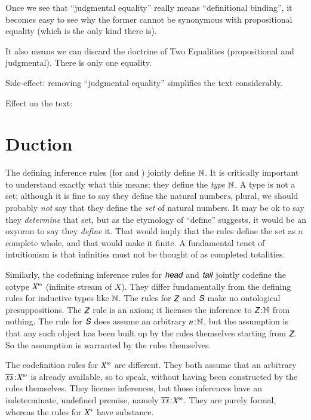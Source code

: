 \documentclass{article}
\begin{document}
Once we see that ``judgmental equality'' really means ``definitional
binding'', it becomes easy to see why the former cannot be synonymous
with propositional equality (which is the only kind there is).

It also means we can discard the doctrine of Two Equalities
(propositional and judgmental). There is only one equality.

Side-effect: removing ``judgmental equality'' simplifies the text
considerably.

Effect on the text:


\section{Duction}

The defining inference rules (for \ZNat and \SNat) jointly define
\(\mathbb{N}\). It is critically important to understand exactly what this
means: they define the \textit{type} \(\mathbb{N}\). A type is not a set;
although it is fine to say they define the natural number\textit{s},
plural, we should probably \textit{not} say that they define the
\textit{set} of natural numbers. It may be ok to say they
\textit{determine} that set, but as the etymology of ``define''
suggests, it would be an oxyoron to say they \textit{define} it. That
would imply that the rules define the set as a complete whole, and
that would make it finite. A fundamental tenet of intuitionism is that
infinities must not be thought of as completed totalities.

Similarly, the codefining inference rules for \(\cohead\) and
\(\cotail\) jointly codefine the cotype \(\colist{X}\) (infinite
stream of \(X\)). They differ fundamentally from the defining rules
for inductive types like \(\mathbb{N}\). The rules for \(\ZNat\) and
\(\SNat\) make no ontological presuppositions. The \(\ZNat\) rule is
an axiom; it licenses the inference to \(\tj{\ZNat}{\Nat}\) from
nothing. The rule for \(\SNat\) does assume an arbitrary
\(n\hspace{1pt}\mathpunct{:}\hspace{-1pt}\mathbb{N}\), but the assumption is that any such object has been
built up by the rules themselves starting from \(\ZNat\). So the
assumption is warranted by the rules themselves.

The codefinition rules for \(\colist{X}\) are different. They both
assume that an arbitrary \(\tj{\coseq{x}}{\colist{X}}\) is already
available, so to speak, without having been constructed by the rules
themselves. They license inferences, but those inferences have an
indeterminate, undefined premise, namely
\(\tj{\coseq{x}}{\colist{X}}\). They are purely formal, whereas the
rules for \({X^{*}}\) have substance.
\end{document}
